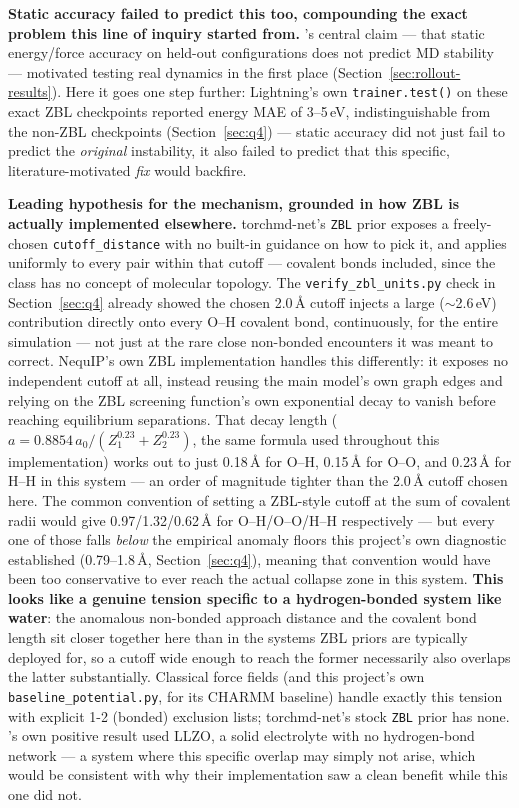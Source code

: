 \documentclass[11pt]{article}
\begin{document}
\textbf{Static accuracy failed to predict this too, compounding the exact
problem this line of inquiry started from.} \citet{fu2022forces}'s central
claim --- that static energy/force accuracy on held-out configurations does
not predict MD stability --- motivated testing real dynamics in the first
place (Section~\ref{sec:rollout-results}). Here it goes one step further:
Lightning's own \texttt{trainer.test()} on these exact ZBL checkpoints
reported energy MAE of 3--5\,eV, indistinguishable from the non-ZBL
checkpoints (Section~\ref{sec:q4}) --- static accuracy did not just fail to
predict the \emph{original} instability, it also failed to predict that this
specific, literature-motivated \emph{fix} would backfire.

\textbf{Leading hypothesis for the mechanism, grounded in how ZBL is
actually implemented elsewhere.} torchmd-net's \texttt{ZBL} prior exposes a
freely-chosen \texttt{cutoff\_distance} with no built-in guidance on how to
pick it, and applies uniformly to every pair within that cutoff --- covalent
bonds included, since the class has no concept of molecular topology. The
\texttt{verify\_zbl\_units.py} check in Section~\ref{sec:q4} already showed
the chosen 2.0\,\AA{} cutoff injects a large ($\sim$2.6\,eV) contribution
directly onto
every O--H covalent bond, continuously, for the entire simulation --- not
just at the rare close non-bonded encounters it was meant to correct.
NequIP's own ZBL implementation \citep{nequip-code} handles this
differently: it exposes no independent cutoff at all, instead reusing the
main model's own graph edges and relying on the ZBL screening function's own
exponential decay to vanish before reaching equilibrium separations. That
decay length ($a = 0.8854\,a_0/(Z_1^{0.23}+Z_2^{0.23})$, the same formula
used throughout this implementation) works out to just 0.18\,\AA{} for O--H,
0.15\,\AA{} for O--O, and 0.23\,\AA{} for H--H in this system --- an order of
magnitude tighter than the 2.0\,\AA{} cutoff chosen here. The common
convention of setting a ZBL-style cutoff at the sum of covalent radii would
give 0.97/1.32/0.62\,\AA{} for O--H/O--O/H--H respectively --- but every one
of those falls \emph{below} the empirical anomaly floors this project's own
diagnostic established (0.79--1.8\,\AA, Section~\ref{sec:q4}), meaning that
convention would have been too conservative to ever reach the actual
collapse zone in this system. \textbf{This looks like a genuine tension
specific to a hydrogen-bonded system like water}: the anomalous non-bonded
approach distance and the covalent bond length sit closer together here than
in the systems ZBL priors are typically deployed for, so a cutoff wide enough
to reach the former necessarily also overlaps the latter substantially.
Classical force fields (and this project's own
\texttt{baseline\_potential.py}, for its CHARMM baseline) handle exactly
this tension with explicit 1-2 (bonded) exclusion lists; torchmd-net's stock
\texttt{ZBL} prior has none. \citet{shortrangeprior2025}'s own positive
result used LLZO, a solid electrolyte with no hydrogen-bond network --- a
system where this specific overlap may simply not arise, which would be
consistent with why their implementation saw a clean benefit while this one
did not.
\end{document}
